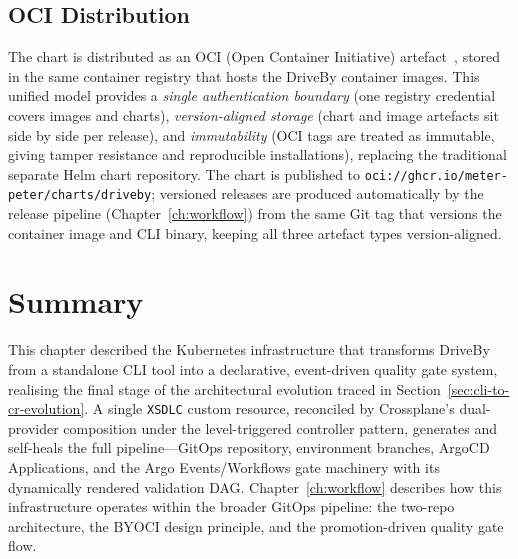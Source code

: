 \subsection{OCI Distribution}
\label{subsec:oci-distribution}

The chart is distributed as an OCI (Open Container Initiative) artefact~\cite{helm-oci}, stored in the same container registry that hosts the DriveBy container images. This unified model provides a \textit{single authentication boundary} (one registry credential covers images and charts), \textit{version-aligned storage} (chart and image artefacts sit side by side per release), and \textit{immutability} (OCI tags are treated as immutable, giving tamper resistance and reproducible installations), replacing the traditional separate Helm chart repository. The chart is published to \texttt{oci://ghcr.io/meter-peter/charts/driveby}; versioned releases are produced automatically by the release pipeline (Chapter~\ref{ch:workflow}) from the same Git tag that versions the container image and CLI binary, keeping all three artefact types version-aligned.

\section{Summary}
\label{sec:k8s-summary}

This chapter described the Kubernetes infrastructure that transforms DriveBy from a standalone CLI tool into a declarative, event-driven quality gate system, realising the final stage of the architectural evolution traced in Section~\ref{sec:cli-to-cr-evolution}. A single \texttt{XSDLC} custom resource, reconciled by Crossplane's dual-provider composition under the level-triggered controller pattern, generates and self-heals the full pipeline---GitOps repository, environment branches, ArgoCD Applications, and the Argo Events/Workflows gate machinery with its dynamically rendered validation DAG. Chapter~\ref{ch:workflow} describes how this infrastructure operates within the broader GitOps pipeline: the two-repo architecture, the BYOCI design principle, and the promotion-driven quality gate flow.
